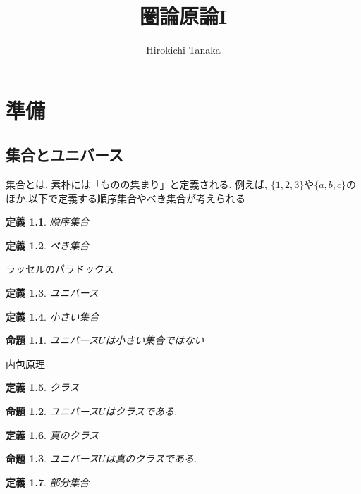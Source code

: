 \documentclass{jsbook}
\title{圏論原論I}
\author{Hirokichi Tanaka}
\theoremstyle{plain}
\newtheorem{Def}{定義}[chapter]
\newtheorem{Prop}{命題}[chapter]
\begin{document}
\setcounter{tocdepth}{2}
\maketitle

\tableofcontents
\newpage
\chapter{準備}
\section{集合とユニバース}
集合とは, 素朴には「ものの集まり」と定義される. 例えば, $\{1,2,3\}$や$\{a,b,c\}$のほか,以下で定義する順序集合やべき集合が考えられる
\begin{Def}
順序集合
\end{Def}
\begin{Def}
べき集合
\end{Def}
ラッセルのパラドックス
\begin{Def}
ユニバース
\end{Def}
\begin{Def}
小さい集合
\end{Def}
\begin{Prop}
ユニバース$U$は小さい集合ではない
\end{Prop}
内包原理

\begin{Def}
クラス
\end{Def}
\begin{Prop}
ユニバース$U$はクラスである.
\end{Prop}
\begin{Def}
真のクラス
\end{Def}
\begin{Prop}
ユニバース$U$は真のクラスである.
\end{Prop}
\begin{Def}
部分集合
\end{Def}
\end{document}
